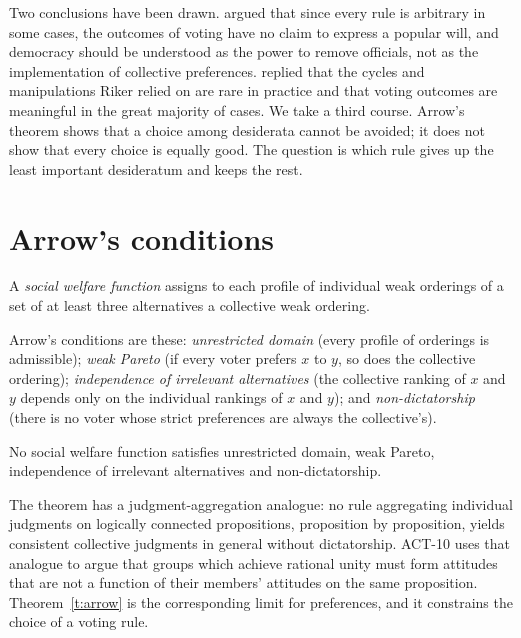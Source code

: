 \documentclass{situationist-preprint}
\begin{document}
Two conclusions have been drawn. \citet{Riker1982} argued that since every rule is arbitrary in some cases, the outcomes of voting have no claim to express a popular will, and democracy should be understood as the power to remove officials, not as the implementation of collective preferences. \citet{Mackie2003} replied that the cycles and manipulations Riker relied on are rare in practice and that voting outcomes are meaningful in the great majority of cases. We take a third course. Arrow's theorem shows that a choice among desiderata cannot be avoided; it does not show that every choice is equally good. The question is which rule gives up the least important desideratum and keeps the rest.

\section{Arrow's conditions}

\begin{definition}\label{d:swf}
A \emph{social welfare function} assigns to each profile of individual weak orderings of a set of at least three alternatives a collective weak ordering.
\end{definition}

Arrow's conditions are these: \emph{unrestricted domain} (every profile of orderings is admissible); \emph{weak Pareto} (if every voter prefers $x$ to $y$, so does the collective ordering); \emph{independence of irrelevant alternatives} (the collective ranking of $x$ and $y$ depends only on the individual rankings of $x$ and $y$); and \emph{non-dictatorship} (there is no voter whose strict preferences are always the collective's).

\begin{theorem}\label{t:arrow}
No social welfare function satisfies unrestricted domain, weak Pareto, independence of irrelevant alternatives and non-dictatorship.
\end{theorem}

The theorem has a judgment-aggregation analogue: no rule aggregating individual judgments on logically connected propositions, proposition by proposition, yields consistent collective judgments in general without dictatorship. ACT-10 uses that analogue to argue that groups which achieve rational unity must form attitudes that are not a function of their members' attitudes on the same proposition. Theorem~\ref{t:arrow} is the corresponding limit for preferences, and it constrains the choice of a voting rule.
\end{document}
